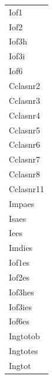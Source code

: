 \begin{tabular}{l}
Iof1\\
Iof2\\
Iof3h\\
\addlinespace
Iof3i\\
Iof6\\
Cclasnr2\\
Cclasnr3\\
Cclasnr4\\
\addlinespace
Cclasnr5\\
Cclasnr6\\
Cclasnr7\\
Cclasnr8\\
Cclasnr11\\
\addlinespace
Impaes\\
Isaes\\
Iees\\
Imdies\\
Iof1es\\
\addlinespace
Iof2es\\
Iof3hes\\
Iof3ies\\
Iof6es\\
Ingtotob\\
\addlinespace
Ingtotes\\
Ingtot\\
\bottomrule
\end{tabular}
